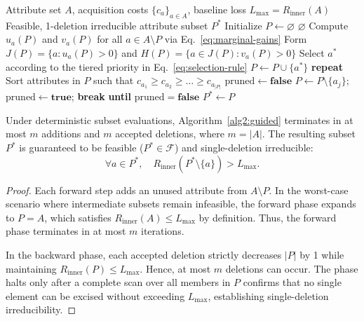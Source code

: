 \begin{algorithm}[t]
	\caption{Dependency-Guided Cost-Sensitive Attribute Reduction}
	\label{alg2:guided}
	\begin{algorithmic}[1]
		\Require Attribute set $A$, acquisition costs $\{c_a\}_{a \in A}$, baseline loss $L_{\max} = R_{\mathrm{inner}}(A)$
		\Ensure Feasible, 1-deletion irreducible attribute subset $P^*$
		\State Initialize $P \gets \varnothing$
		\State \Return $\varnothing$
		\EndIf
		 
		\State Compute $u_a(P)$ and $v_a(P)$ for all $a \in A \setminus P$ via Eq.~\eqref{eq:marginal-gains}
		\State Form $J(P) = \{a : u_a(P) > 0\}$ and $H(P) = \{a \in J(P) : v_a(P) > 0\}$
		\State Select $a^*$ according to the tiered priority in Eq.~\eqref{eq:selection-rule}
		\State $P \gets P \cup \{a^*\}$
		\EndWhile
		\State \textbf{repeat} 
		\State Sort attributes in $P$ such that $c_{a_1} \ge c_{a_2} \ge \dots \ge c_{a_{|P|}}$
		\State $\mathrm{pruned} \gets \textbf{false}$
		\State $P \gets P \setminus \{a_j\}$; $\mathrm{pruned} \gets \textbf{true}$; \textbf{break}
		\EndIf
		\EndFor
		\State \textbf{until} $\mathrm{pruned} = \textbf{false}$
		\State \Return $P^* \gets P$
	\end{algorithmic}
\end{algorithm}



\begin{proposition}
	\label{prop:heuristic-guarantee}
	Under deterministic subset evaluations, Algorithm~\ref{alg2:guided} terminates in at most $m$ additions and $m$ accepted deletions, where $m = |A|$. The resulting subset $P^*$ is guaranteed to be feasible ($P^* \in \mathcal{F}$) and single-deletion irreducible:
	\begin{equation}
		\forall a \in P^*, \quad R_{\mathrm{inner}}(P^* \setminus \{a\}) > L_{\max}.
	\end{equation}
\end{proposition}
\begin{proof}
	Each forward step adds an unused attribute from $A \setminus P$. In the worst-case scenario where intermediate subsets remain infeasible, the forward phase expands to $P = A$, which satisfies $R_{\mathrm{inner}}(A) \le L_{\max}$ by definition. Thus, the forward phase terminates in at most $m$ iterations. 
	
	In the backward phase, each accepted deletion strictly decreases $|P|$ by 1 while maintaining $R_{\mathrm{inner}}(P) \le L_{\max}$. Hence, at most $m$ deletions can occur. The phase halts only after a complete scan over all members in $P$ confirms that no single element can be excised without exceeding $L_{\max}$, establishing single-deletion irreducibility.
\end{proof}

